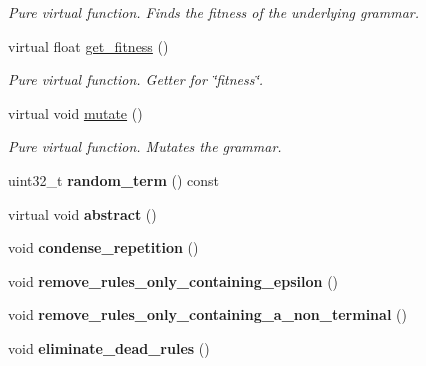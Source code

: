 \begin{DoxyCompactItemize}
\begin{DoxyCompactList}\small\item\em Pure virtual function. Finds the fitness of the underlying grammar. \end{DoxyCompactList}\item 
virtual float \mbox{\hyperlink{classBinary__map__grammar_a4576956993498f6935206bb70c40fda7}{get\+\_\+fitness}} ()
\begin{DoxyCompactList}\small\item\em Pure virtual function. Getter for \char`\"{}fitness\char`\"{}. \end{DoxyCompactList}\item 
virtual void \mbox{\hyperlink{classBinary__map__grammar_aa4c18786cf06a366de319c521767b7ce}{mutate}} ()
\begin{DoxyCompactList}\small\item\em Pure virtual function. Mutates the grammar. \end{DoxyCompactList}\item 
\mbox{\label{classBinary__map__grammar_a5728411e8df5ee1c0865aca1801739ee}} 
uint32\+\_\+t {\bfseries random\+\_\+term} () const
\item 
\mbox{\label{classBinary__map__grammar_a90826a6dfff31565f33bcc110286a6fc}} 
virtual void {\bfseries abstract} ()
\item 
\mbox{\label{classBinary__map__grammar_a9b6d0707ee4bc1ffef573d82ff0543e5}} 
void {\bfseries condense\+\_\+repetition} ()
\item 
\mbox{\label{classBinary__map__grammar_a19b3428938a93471e4fb34f94bb6d7b5}} 
void {\bfseries remove\+\_\+rules\+\_\+only\+\_\+containing\+\_\+epsilon} ()
\item 
\mbox{\label{classBinary__map__grammar_a17780463fbcf31d14d6c1d13eeef1b60}} 
void {\bfseries remove\+\_\+rules\+\_\+only\+\_\+containing\+\_\+a\+\_\+non\+\_\+terminal} ()
\item 
\mbox{\label{classBinary__map__grammar_a0c708a4c169af4a20747efb7dd8407a2}} 
void {\bfseries eliminate\+\_\+dead\+\_\+rules} ()
\item 

\end{DoxyCompactItemize}
